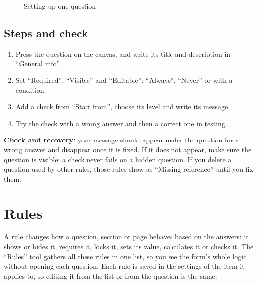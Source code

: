 \begin{figure}[H]
\centering
{}
\rclegend
\caption{Setting up one question}
\label{fig:builder-forms-field-settings-flow}
\end{figure}

\subsection{Steps and check}
\begin{enumerate}
\item Press the question on the canvas, and write its title and description in “General info”.
\item Set “Required”, “Visible” and “Editable”: “Always”, “Never” or with a condition.
\item Add a check from “Start from”, choose its level and write its message.
\item Try the check with a wrong answer and then a correct one in testing.
\end{enumerate}

\textbf{Check and recovery:} your message should appear under the question for a wrong answer and disappear once it is fixed. If it does not appear, make sure the question is visible; a check never fails on a hidden question. If you delete a question used by other rules, those rules show as “Missing reference” until you fix them.

\clearpage
\section{Rules}
\label{sec:builder-feature-forms-rules}

A rule changes how a question, section or page behaves based on the answers: it shows or hides it, requires it, locks it, sets its value, calculates it or checks it. The “Rules” tool gathers all these rules in one list, so you see the form's whole logic without opening each question. Each rule is saved in the settings of the item it applies to, so editing it from the list or from the question is the same.

